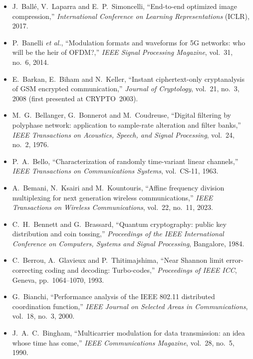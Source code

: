 \begin{itemize}[leftmargin=1.5em,itemindent=-1.5em,itemsep=1.5pt plus 1pt,parsep=0pt,topsep=4pt,label={}]
\item J.~Ball\'e, V.~Laparra and E.~P.~Simoncelli, ``End-to-end optimized image compression,'' \emph{International Conference on Learning Representations} (ICLR), 2017.
\item P.~Banelli \emph{et al.}, ``Modulation formats and waveforms for 5G networks: who will be the heir of OFDM?,'' \emph{IEEE Signal Processing Magazine}, vol.~31, no.~6, 2014.
\item E.~Barkan, E.~Biham and N.~Keller, ``Instant ciphertext-only cryptanalysis of GSM encrypted communication,'' \emph{Journal of Cryptology}, vol.~21, no.~3, 2008 (first presented at CRYPTO~2003).
\item M.~G.~Bellanger, G.~Bonnerot and M.~Coudreuse, ``Digital filtering by polyphase network: application to sample-rate alteration and filter banks,'' \emph{IEEE Transactions on Acoustics, Speech, and Signal Processing}, vol.~24, no.~2, 1976.
\item P.~A.~Bello, ``Characterization of randomly time-variant linear channels,'' \emph{IEEE Transactions on Communications Systems}, vol.~CS-11, 1963.
\item A.~Bemani, N.~Ksairi and M.~Kountouris, ``Affine frequency division multiplexing for next generation wireless communications,'' \emph{IEEE Transactions on Wireless Communications}, vol.~22, no.~11, 2023.
\item C.~H.~Bennett and G.~Brassard, ``Quantum cryptography: public key distribution and coin tossing,'' \emph{Proceedings of the IEEE International Conference on Computers, Systems and Signal Processing}, Bangalore, 1984.
\item C.~Berrou, A.~Glavieux and P.~Thitimajshima, ``Near Shannon limit error-correcting coding and decoding: Turbo-codes,'' \emph{Proceedings of IEEE ICC}, Geneva, pp.~1064--1070, 1993.
\item G.~Bianchi, ``Performance analysis of the IEEE 802.11 distributed coordination function,'' \emph{IEEE Journal on Selected Areas in Communications}, vol.~18, no.~3, 2000.
\item J.~A.~C.~Bingham, ``Multicarrier modulation for data transmission: an idea whose time has come,'' \emph{IEEE Communications Magazine}, vol.~28, no.~5, 1990.

\end{itemize}
